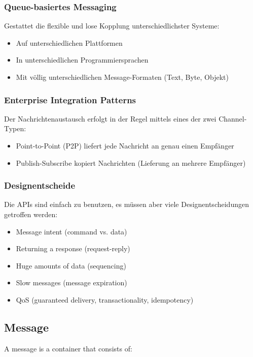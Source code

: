\subsubsection{Queue-basiertes Messaging} Gestattet die flexible und lose Kopplung unterschiedlichster Systeme:

\begin{itemize}
	\item Auf unterschiedlichen Plattformen
	\item In unterschiedlichen Programmiersprachen
	\item Mit völlig unterschiedlichen Message-Formaten (Text, Byte, Objekt)
\end{itemize}

\subsubsection{Enterprise Integration Patterns}
Der Nachrichtenaustausch erfolgt in der Regel mittels eines der zwei Channel-Typen:
\begin{itemize}
	\item Point-to-Point (P2P) liefert jede Nachricht an genau einen Empfänger
	\item Publish-Subscribe kopiert Nachrichten (Lieferung an mehrere Empfänger)
\end{itemize}


\subsubsection{Designentscheide}
Die APIs sind einfach zu benutzen, es müssen aber viele Designentscheidungen getroffen werden:
\begin{itemize}
	\item Message intent (command vs. data)
	\item Returning a response (request-reply)
	\item Huge amounts of data (sequencing)
	\item Slow messages (message expiration)
	\item QoS (guaranteed delivery, transactionality, idempotency)
\end{itemize}

\newpage


\subsection{Message}
A message is a container that consists of:

